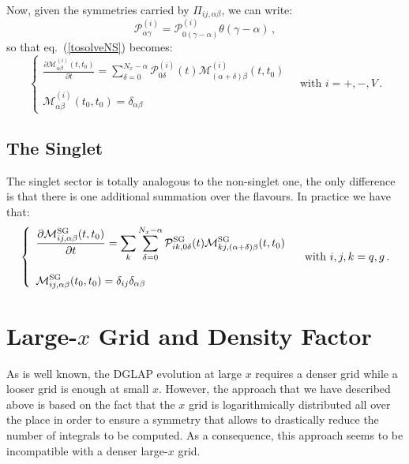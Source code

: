 \documentclass[10pt,a4paper]{article}
\begin{document}
Now, given the symmetries carried by $\Pi_{ij,\alpha\beta}$, we can write:
\begin{equation}
\mathcal{P}_{\alpha\gamma}^{(i)} = \mathcal{P}_{0(\gamma-\alpha)}^{(i)}\theta(\gamma-\alpha)\,,
\end{equation}
so that eq.~(\ref{tosolveNS}) becomes:
\begin{equation}\label{tosolveNS1}
\left\{\begin{array}{l}
\displaystyle \frac{\partial  \mathcal{M}_{\alpha\beta}^{(i)}(t,t_0)}{\partial t}= \sum_{\delta=0}^{N_x-\alpha} \mathcal{P}_{0\delta}^{(i)}(t)\mathcal{M}_{(\alpha+\delta)\beta}^{(i)}(t,t_0)\\
\\
\displaystyle \mathcal{M}_{\alpha\beta}^{(i)}(t_0,t_0)=\delta_{\alpha\beta}
\end{array}\right.\quad\mbox{with } i=+,-,V\,.
\end{equation}

\subsection{The Singlet}

The singlet sector is totally analogous to the non-singlet one, the only difference is that there is one additional summation over the flavours. In practice we have that:
\begin{equation}\label{tosolveSG}
\left\{\begin{array}{l}
\displaystyle \frac{\partial  \mathcal{M}_{ij,\alpha\beta}^{\rm SG}(t,t_0)}{\partial t}= \sum_k \sum_{\delta=0}^{N_x-\alpha} \mathcal{P}_{ik,0\delta}^{\rm SG}(t)\mathcal{M}_{kj,(\alpha+\delta)\beta}^{\rm SG}(t,t_0)\\
\\
\displaystyle \mathcal{M}_{ij,\alpha\beta}^{\rm SG}(t_0,t_0)=\delta_{ij}\delta_{\alpha\beta}
\end{array}\right.\quad\mbox{with }i,j,k=q,g\,.
\end{equation}

\section{Large-$x$ Grid and Density Factor}

As is well known, the DGLAP evolution at large $x$ requires a denser grid while a looser grid is enough at small $x$. However, the approach that we have described above is based on the fact that the $x$ grid is logarithmically distributed all over the place in order to ensure a symmetry that allows to drastically reduce the number of integrals to be computed. As a consequence, this approach seems to be incompatible with a denser large-$x$ grid.
\end{document}
